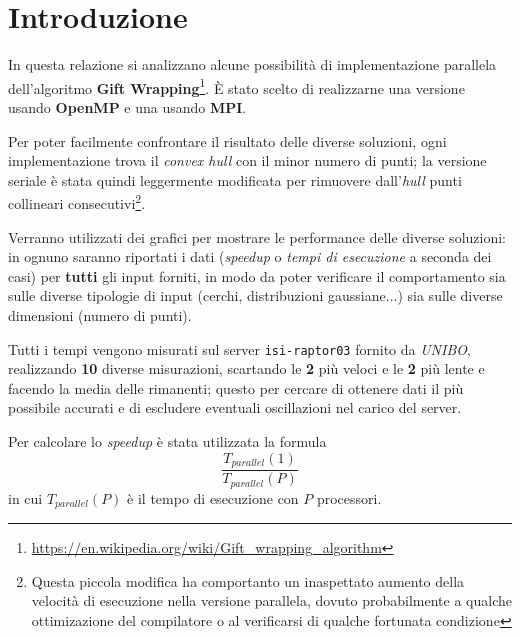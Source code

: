 \section{Introduzione}
In questa relazione si analizzano alcune possibilità di implementazione parallela dell'algoritmo \textbf{Gift Wrapping}\footnote{\url{https://en.wikipedia.org/wiki/Gift\_wrapping\_algorithm}}.
È stato scelto di realizzarne una versione usando \textbf{OpenMP} e una usando \textbf{MPI}.

Per poter facilmente confrontare il risultato delle diverse soluzioni, ogni implementazione trova il \emph{convex hull} con il minor numero di punti;
la versione seriale è stata quindi leggermente modificata per rimuovere dall'\emph{hull} punti collineari consecutivi\footnote{Questa piccola modifica ha comportanto un inaspettato aumento della velocità di esecuzione nella versione parallela, dovuto probabilmente a qualche ottimizazione del compilatore o al verificarsi di qualche fortunata condizione}.
 
Verranno utilizzati dei grafici per mostrare le performance delle diverse soluzioni:
in ognuno saranno riportati i dati (\emph{speedup} o \emph{tempi di esecuzione} a seconda dei casi) per \textbf{tutti} gli input forniti,
in modo da poter verificare il comportamento sia sulle diverse tipologie di input (cerchi, distribuzioni gaussiane...) sia sulle diverse dimensioni (numero di punti).

Tutti i tempi vengono misurati sul server \texttt{isi-raptor03} fornito da \emph{UNIBO}, realizzando \textbf{10} diverse misurazioni, scartando le \textbf{2} più veloci e le \textbf{2} più lente e facendo la media delle rimanenti;
questo per cercare di ottenere dati il più possibile accurati e di escludere eventuali oscillazioni nel carico del server.

Per calcolare lo \emph{speedup} è stata utilizzata la formula
\begin{equation}
    \frac{T_{parallel}(1)}{T_{parallel}(P)}
\end{equation}
in cui $T_{parallel}(P)$ è il tempo di esecuzione con $P$ processori.
